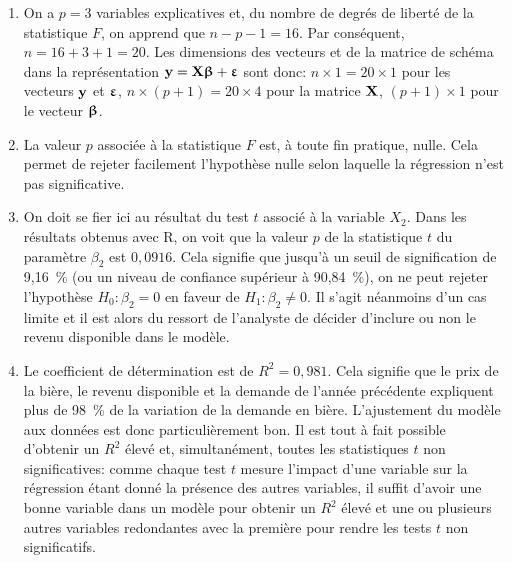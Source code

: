 \begin{solution}{3.10}
    \begin{enumerate}
    \item On a $p = 3$ variables explicatives et, du nombre de degrés
      de liberté de la statistique $F$, on apprend que $n - p - 1 =
      16$. Par conséquent, $n = 16 + 3 + 1 = 20$. Les dimensions des
      vecteurs et de la matrice de schéma dans la représentation
      $\mathbf{y} = \mathbf{X} \boldsymbol{\upbeta} + \boldsymbol{\upvarepsilon}$ sont donc: $n \times 1 = 20
      \times 1$ pour les vecteurs $\mathbf{y}$ et $\boldsymbol{\upvarepsilon}$, $n \times (p
      + 1) = 20 \times 4$ pour la matrice $\mathbf{X}$, $(p + 1) \times
      1$ pour le vecteur $\boldsymbol{\upbeta}$.
    \item La valeur $p$ associée à la statistique $F$ est, à toute fin
      pratique, nulle. Cela permet de rejeter facilement l'hypothèse
      nulle selon laquelle la régression n'est pas significative.
    \item On doit se fier ici au résultat du test $t$ associé à la
      variable $X_2$. Dans les résultats obtenus avec \textsf{R}, on
      voit que la valeur $p$ de la statistique $t$ du paramètre
      $\beta_2$ est $0,0916$. Cela signifie que jusqu'à un seuil de
      signification de 9,16~\% (ou un niveau de confiance supérieur à
      90,84~\%), on ne peut rejeter l'hypothèse $H_0: \beta_2 = 0$ en
      faveur de $H_1: \beta_2 \ne 0$. Il s'agit néanmoins d'un cas
      limite et il est alors du ressort de l'analyste de décider
      d'inclure ou non le revenu disponible dans le modèle.
    \item Le coefficient de détermination est de $R^2 = 0,981$. Cela
      signifie que le prix de la bière, le revenu disponible et la
      demande de l'année précédente expliquent plus de 98~\% de la
      variation de la demande en bière. L'ajustement du modèle aux
      données est donc particulièrement bon. Il est tout à fait
      possible d'obtenir un $R^2$ élevé et, simultanément, toutes les
      statistiques $t$ non significatives: comme chaque test $t$
      mesure l'impact d'une variable sur la régression étant donné la
      présence des autres variables, il suffit d'avoir une bonne
      variable dans un modèle pour obtenir un $R^2$ élevé et une ou
      plusieurs autres variables redondantes avec la première pour
      rendre les tests $t$ non significatifs.
    \end{enumerate}
  
\end{solution}

